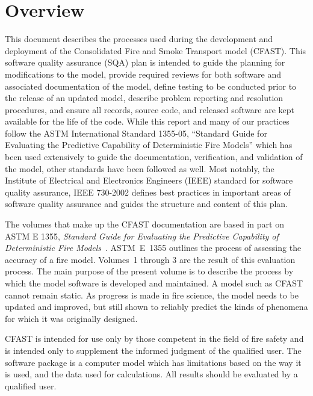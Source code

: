 \documentclass[12pt]{book}
\begin{document}
\cleardoublepage
{}
{}
\tableofcontents

\cleardoublepage
{}
{}
\listoffigures


\mainmatter

\chapter{Overview}

This document describes the processes used during the development and deployment of the Consolidated Fire and Smoke Transport model (CFAST).  This software quality assurance (SQA) plan is intended to guide the planning for modifications to the model, provide required reviews for both software and associated documentation of the model, define testing to be conducted prior to the release of an updated model, describe problem reporting and resolution procedures, and ensure all records, source code, and released software are kept available for the life of the code.  While this report and many of our practices follow the ASTM International Standard 1355-05, ``Standard Guide for Evaluating the Predictive Capability of Deterministic Fire Models'' \cite{CFAST:ASTM:E1355} which has been used extensively to guide the documentation, verification, and validation of the model, other standards have been followed as well.  Most notably, the Institute of Electrical and Electronics Engineers (IEEE) standard for software quality assurance, IEEE 730-2002 \cite{CFAST:IEEE:730} defines best practices in important areas of software quality assurance and guides the structure and content of this plan.

The volumes that make up the CFAST documentation are based in part on ASTM E 1355, {\em Standard Guide for Evaluating the Predictive Capability of Deterministic Fire Models}~\cite{CFAST:ASTM:E1355}. ASTM~E~1355 outlines the process of assessing the accuracy of a fire model. Volumes~1 through 3 are the result of this evaluation process. The main purpose of the present volume is to describe the process by which the model software is developed and maintained. A model such as CFAST cannot remain static. As progress is made in fire science, the model needs to be updated and improved, but still shown to reliably predict the kinds of phenomena for which it was originally designed.

CFAST is intended for use only by those competent in the field of fire safety and is intended only to supplement the informed judgment of the qualified user. The software package is a computer model which has limitations based on the way it is used, and the data used for calculations. All results should be evaluated by a qualified user.
\end{document}
